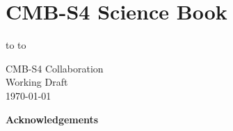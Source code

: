 \documentclass[titlepage]{tcibook}
\begin{document}


\def\bibname{References}



\raggedbottom


\parindent=0pt
\parskip=8pt
\setlength{\evensidemargin}{0pt}
\setlength{\oddsidemargin}{0pt}
\setlength{\marginparsep}{0.0in}
\setlength{\marginparwidth}{0.0in}
\marginparpush=0pt


\renewcommand{\chapname}{chap:intro_}
\renewcommand{\chapterdir}{.}
\renewcommand{\arraystretch}{1.25}
\addtolength{\arraycolsep}{-3pt}

\chapter*{CMB-S4 Science Book}
\vskip -9.5pt
\hbox to
\vskip-6.5pt
\hbox to

{\Large\bf
  \begin{center}
   CMB-S4 Collaboration\\
   Working Draft\\
   \bigskip
   \today
 \end{center}
}
\eject

\setcounter{page}{1}



\begin{center}
  {\Large \bf Acknowledgements}
\end{center}
  
\tableofcontents


\def\as#1{[{\bf AS:} {\it #1}] }


\end{document}
